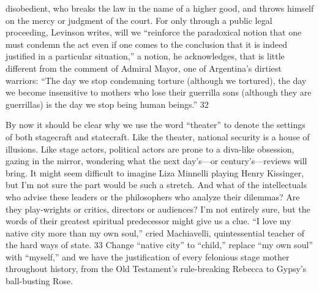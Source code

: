 disobedient, who breaks the law in the name of a higher good, and throws himself on the mercy or judgment of the court. For only through a public legal proceeding, Levinson writes, will we “reinforce the paradoxical notion that one must condemn the act even if one comes to the conclusion that it is indeed justified in a particular situation,” a notion, he acknowledges, that is little different from the comment of Admiral Mayor, one of Argentina’s dirtiest warriors: “The day we stop condemning torture (although we tortured), the day we become insensitive to mothers who lose their guerrilla sons (although they are guerrillas) is the day we stop being human beings.” {\color{blue} 32 } {\par} By now it should be clear why we use the word “theater” to denote the settings of both stagecraft and statecraft. Like the theater, national security is a house of illusions. Like stage actors, political actors are prone to a diva-like obsession, gazing in the mirror, wondering what the next day’s—or century’s—reviews will bring. It might seem difficult to imagine Liza Minnelli playing Henry Kissinger, but I’m not sure the part would be such a stretch. And what of the intellectuals who advise these leaders or the philosophers who analyze their dilemmas? Are they play-wrights or critics, directors or audiences? I’m not entirely sure, but the words of their greatest spiritual predecessor might give us a clue. “I love my native city more than my own soul,” cried Machiavelli, quintessential teacher of the hard ways of state. {\color{blue} 33 } Change “native city” to “child,” replace “my own soul” with “myself,” and we have the justification of every felonious stage mother throughout history, from the Old Testament’s rule-breaking Rebecca to Gypsy's ball-busting Rose.{\par}